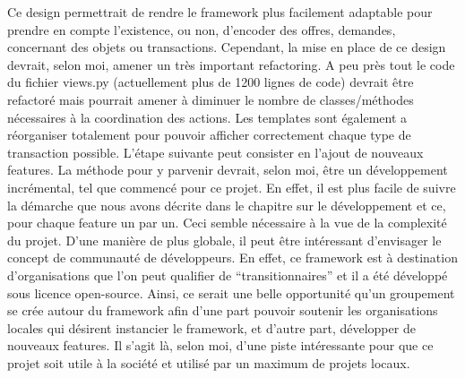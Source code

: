 Ce design permettrait de rendre le framework plus facilement adaptable pour prendre en compte l'existence,  ou non,  d'encoder des offres,  demandes,  concernant des objets ou transactions.  
\vspace{0.5cm}
Cependant,  la mise en place de ce design devrait,  selon moi,  amener un très important refactoring.  A peu près tout le code du fichier views.py (actuellement plus de 1200 lignes de code) devrait être refactoré mais pourrait amener à diminuer le nombre de classes/méthodes nécessaires à la coordination des actions.  Les templates sont également a réorganiser totalement pour pouvoir afficher correctement chaque type de transaction possible.   
\vspace{0.5cm}
 L'étape suivante peut consister en l'ajout de nouveaux features.  La méthode pour y parvenir devrait,  selon moi,  être un développement incrémental,  tel que commencé pour ce projet. En effet,  il est plus facile de suivre la démarche que nous avons décrite dans le chapitre sur le développement et ce,  pour chaque feature un par un.  Ceci semble nécessaire à la vue de la complexité du projet.  
\vspace{0.5cm}
D'une manière de plus globale,  il peut être intéressant d'envisager le concept de communauté de développeurs.  En effet,  ce framework est à destination d'organisations que l'on peut qualifier de ``transitionnaires'' et il a été développé sous licence open-source.  Ainsi,  ce serait une belle opportunité qu'un groupement se crée autour du framework afin d'une part pouvoir soutenir les organisations locales qui désirent instancier le framework,  et d'autre part,  développer de nouveaux features.  Il s'agit là,  selon moi,  d'une piste intéressante pour que ce projet soit utile à la société et utilisé par un maximum de projets locaux.  

